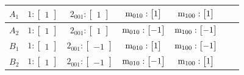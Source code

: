 \documentclass[fleqn,8pt,landscape]{jsarticle}
\begin{document}
\begin{longtable}{ccccccc}
$ A_{1} $ & $ 1:\begin{bmatrix} 1 \end{bmatrix} $ & $ 2{}_{001}:\begin{bmatrix} 1 \end{bmatrix} $ & $ {\rm m}_{010}:\begin{bmatrix} 1 \end{bmatrix} $ & $ {\rm m}_{100}:\begin{bmatrix} 1 \end{bmatrix} $ \\ \hline
$ A_{2} $ & $ 1:\begin{bmatrix} 1 \end{bmatrix} $ & $ 2{}_{001}:\begin{bmatrix} 1 \end{bmatrix} $ & $ {\rm m}_{010}:\begin{bmatrix} -1 \end{bmatrix} $ & $ {\rm m}_{100}:\begin{bmatrix} -1 \end{bmatrix} $ \\ \hline
$ B_{1} $ & $ 1:\begin{bmatrix} 1 \end{bmatrix} $ & $ 2{}_{001}:\begin{bmatrix} -1 \end{bmatrix} $ & $ {\rm m}_{010}:\begin{bmatrix} 1 \end{bmatrix} $ & $ {\rm m}_{100}:\begin{bmatrix} -1 \end{bmatrix} $ \\ \hline
$ B_{2} $ & $ 1:\begin{bmatrix} 1 \end{bmatrix} $ & $ 2{}_{001}:\begin{bmatrix} -1 \end{bmatrix} $ & $ {\rm m}_{010}:\begin{bmatrix} -1 \end{bmatrix} $ & $ {\rm m}_{100}:\begin{bmatrix} 1 \end{bmatrix} $ \\
\end{longtable}
\end{document}
